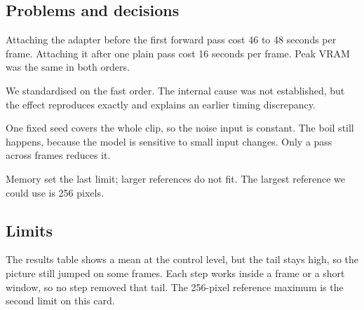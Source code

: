 
\subsection{Problems and decisions}
Attaching the adapter before the first forward pass cost 46 to 48 seconds per frame. Attaching it after one plain pass cost 16 seconds per frame. Peak VRAM was the same in both orders.

We standardised on the fast order. The internal cause was not established, but the effect reproduces exactly and explains an earlier timing discrepancy.

One fixed seed covers the whole clip, so the noise input is constant. The boil still happens, because the model is sensitive to small input changes. Only a pass across frames reduces it.

Memory set the last limit; larger references do not fit. The largest reference we could use is 256 pixels.

\subsection{Limits}
The results table shows a mean at the control level, but the tail stays high, so the picture still jumped on some frames. Each step works inside a frame or a short window, so no step removed that tail. The 256-pixel reference maximum is the second limit on this card.
